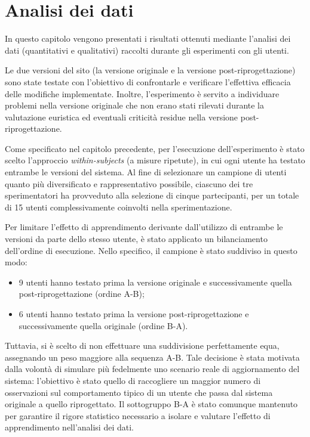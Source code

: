 \section{Analisi dei dati}

In questo capitolo vengono presentati i risultati ottenuti mediante l'analisi dei dati (quantitativi e qualitativi) raccolti durante gli esperimenti con gli utenti.

Le due versioni del sito (la versione originale e la versione post-riprogettazione) sono state testate con l'obiettivo di confrontarle e verificare l'effettiva efficacia delle modifiche implementate. Inoltre, l'esperimento è servito a individuare problemi nella versione originale che non erano stati rilevati durante la valutazione euristica ed eventuali criticità residue nella versione post-riprogettazione.

Come specificato nel capitolo precedente, per l'esecuzione dell'esperimento è stato scelto l'approccio \textit{within-subjects} (a misure ripetute), in cui ogni utente ha testato entrambe le versioni del sistema. Al fine di selezionare un campione di utenti quanto più diversificato e rappresentativo possibile, ciascuno dei tre sperimentatori ha provveduto alla selezione di cinque partecipanti, per un totale di 15 utenti complessivamente coinvolti nella sperimentazione.

Per limitare l'effetto di apprendimento derivante dall'utilizzo di entrambe le versioni da parte dello stesso utente, è stato applicato un bilanciamento dell'ordine di esecuzione. Nello specifico, il campione è stato suddiviso in questo modo:
\begin{itemize}
	\item 9 utenti hanno testato prima la versione originale e successivamente quella post-riprogettazione (ordine A-B);
	\item 6 utenti hanno testato prima la versione post-riprogettazione e successivamente quella originale (ordine B-A).
\end{itemize}

Tuttavia, si è scelto di non effettuare una suddivisione perfettamente equa, assegnando un peso maggiore alla sequenza A-B. Tale decisione è stata motivata dalla volontà di simulare più fedelmente uno scenario reale di aggiornamento del sistema: l'obiettivo è stato quello di raccogliere un maggior numero di osservazioni sul comportamento tipico di un utente che passa dal sistema originale a quello riprogettato. Il sottogruppo B-A è stato comunque mantenuto per garantire il rigore statistico necessario a isolare e valutare l'effetto di apprendimento nell'analisi dei dati.

